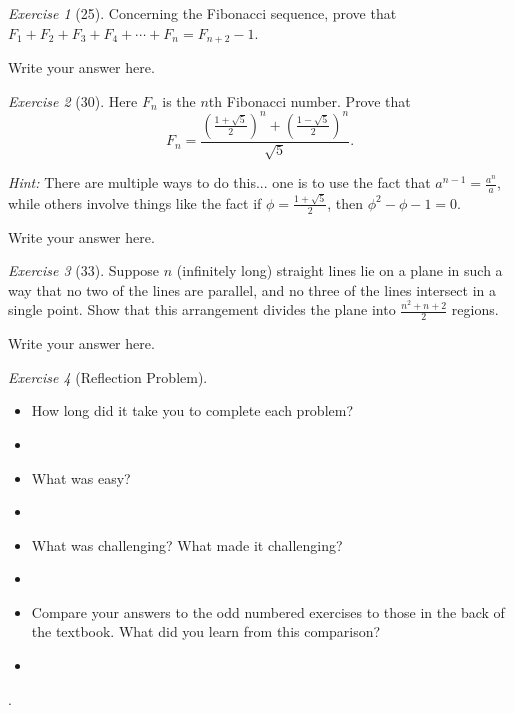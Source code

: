 \documentclass[12pt]{amsart}
\makeatletter
\theoremstyle{remark}
\newtheorem*{exercise}{Exercise}%
\renewenvironment{proof}[1][\proofname]{\par\doublespacing
  \pushQED{\qed}%
  \normalfont \topsep6\p@\@plus6\p@\relax
  \list{}{%
    \settowidth{\leftmargin}{\itshape\proofname:\hskip\labelsep}%
    \setlength{\labelwidth}{0pt}%
    \setlength{\itemindent}{-\leftmargin}%
  }%
  \item[\hskip\labelsep\itshape#1\@addpunct{:}]\ignorespaces
}{%
  \popQED\endlist\@endpefalse
  \singlespacing
}
\theoremstyle{mycomment}
\makeatother
\begin{document}
\begin{exercise}[25] Concerning the Fibonacci sequence, prove that $F_{1}+F_{2}+F_{3}+F_{4}+\cdots+F_{n}=F_{n+2}-1$.
\begin{proof}
Write your answer here.
\end{proof}
\end{exercise}


\begin{exercise}[30] Here $F_{n}$ is the $n$th Fibonacci number. Prove that $$F_{n}=\frac{\left(\frac{1+\sqrt{5}}{2}\right)^{n}+\left(\frac{1-\sqrt{5}}{2}\right)^{n}}{\sqrt{5}}.$$

\emph{Hint:} There are multiple ways to do this... one is to use the fact that $a^{n-1}=\frac{a^{n}}{a}$, while others involve things like the fact if $\phi=\frac{1+\sqrt{5}}{2}$, then $\phi^{2}-\phi-1=0$.
\begin{proof}
Write your answer here.
\end{proof}
\end{exercise}

\begin{exercise}[33] Suppose $n$ (infinitely long) straight lines lie on a plane in such a way that no two of the lines are parallel, and no three of the lines intersect in a single point. Show that this arrangement divides the plane into $\frac{n^{2}+n+2}{2}$ regions.
\begin{proof}
Write your answer here.
\end{proof}
\end{exercise}



\begin{exercise}[Reflection Problem] \ 
\begin{itemize}
\item How long did it take you to complete each problem? 
\begin{proof}[Answer]
\end{proof}
\item What was easy?
\begin{proof}[Answer]
\end{proof}
\item What was challenging? What made it challenging?
\begin{proof}[Answer]
\end{proof}
\item Compare your answers to the odd numbered exercises to those in the back of the textbook. What did you learn from this comparison?
\begin{proof}[Answer]
\end{proof}
\end{itemize}
\end{exercise}.















 
\end{document}
